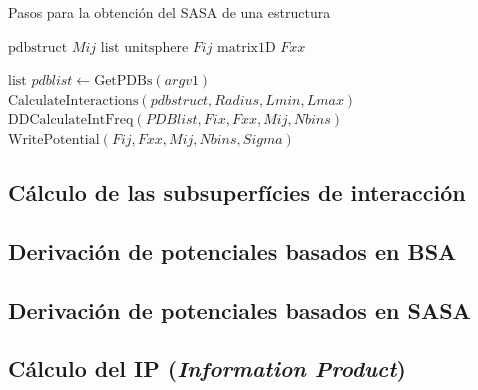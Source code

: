 \begin{algorithm}[H]
\caption{Pasos para la obtención del SASA de una estructura }\label{alg:deralgo1}
\begin{algorithmic}[0]
\State $ \text{pdbstruct } Mij $ 
\State $ \text{list unitsphere } Fij $ 
\State $ \text{matrix1D } Fxx $ 

\State $ \text{list } pdblist \gets \text{GetPDBs}(argv1) $ 
\State $ \text{CalculateInteractions}(pdbstruct,Radius,Lmin,Lmax) $ 
\EndFor
\State $ \text{DDCalculateIntFreq}(PDBlist,Fix,Fxx,Mij,Nbins) $ 
\State $ \text{WritePotential}(Fij,Fxx,Mij,Nbins,Sigma) $ 
\EndProcedure
\end{algorithmic}
\end{algorithm}


\subsection{Cálculo de las subsuperfícies de interacción}
\par
\subsection{Derivación de potenciales basados en BSA}
\par
\subsection{Derivación de potenciales basados en SASA}
\par
\subsection{Cálculo del IP (\textit{Information Product})}
